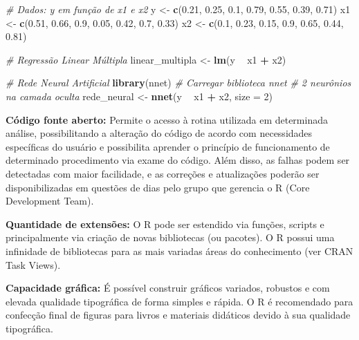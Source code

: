 \documentclass[
  11pt,
  a5paper,
  openany]{book}
\newenvironment{Shaded}{\begin{snugshade}}{\end{snugshade}}
\newcommand{\CommentTok}[1]{\textcolor[rgb]{0.56,0.35,0.01}{\textit{#1}}}
\newcommand{\DataTypeTok}[1]{\textcolor[rgb]{0.13,0.29,0.53}{#1}}
\newcommand{\DecValTok}[1]{\textcolor[rgb]{0.00,0.00,0.81}{#1}}
\newcommand{\FloatTok}[1]{\textcolor[rgb]{0.00,0.00,0.81}{#1}}
\newcommand{\KeywordTok}[1]{\textcolor[rgb]{0.13,0.29,0.53}{\textbf{#1}}}
\newcommand{\NormalTok}[1]{#1}
\newcommand{\OperatorTok}[1]{\textcolor[rgb]{0.81,0.36,0.00}{\textbf{#1}}}
\newcommand{\StringTok}[1]{\textcolor[rgb]{0.31,0.60,0.02}{#1}}
\begin{document}
\begin{Shaded}
\begin{Highlighting}[numbers=left,,]
\CommentTok{# Dados: y em função de x1 e x2}
\NormalTok{y <-}\StringTok{ }\KeywordTok{c}\NormalTok{(}\FloatTok{0.21}\NormalTok{, }\FloatTok{0.25}\NormalTok{, }\FloatTok{0.1}\NormalTok{, }\FloatTok{0.79}\NormalTok{, }\FloatTok{0.55}\NormalTok{, }\FloatTok{0.39}\NormalTok{, }\FloatTok{0.71}\NormalTok{)}
\NormalTok{x1 <-}\StringTok{ }\KeywordTok{c}\NormalTok{(}\FloatTok{0.51}\NormalTok{, }\FloatTok{0.66}\NormalTok{, }\FloatTok{0.9}\NormalTok{, }\FloatTok{0.05}\NormalTok{, }\FloatTok{0.42}\NormalTok{, }\FloatTok{0.7}\NormalTok{, }\FloatTok{0.33}\NormalTok{)}
\NormalTok{x2 <-}\StringTok{ }\KeywordTok{c}\NormalTok{(}\FloatTok{0.1}\NormalTok{, }\FloatTok{0.23}\NormalTok{, }\FloatTok{0.15}\NormalTok{, }\FloatTok{0.9}\NormalTok{, }\FloatTok{0.65}\NormalTok{, }\FloatTok{0.44}\NormalTok{, }\FloatTok{0.81}\NormalTok{)}

\CommentTok{# Regressão Linear Múltipla}
\NormalTok{linear_multipla <-}\StringTok{ }\KeywordTok{lm}\NormalTok{(y }\OperatorTok{~}\StringTok{ }\NormalTok{x1 }\OperatorTok{+}\StringTok{ }\NormalTok{x2)}

\CommentTok{# Rede Neural Artificial}
\KeywordTok{library}\NormalTok{(nnet) }\CommentTok{# Carregar biblioteca nnet}
\CommentTok{# 2 neurônios na camada oculta}
\NormalTok{rede_neural <-}\StringTok{ }\KeywordTok{nnet}\NormalTok{(y }\OperatorTok{~}\StringTok{ }\NormalTok{x1 }\OperatorTok{+}\StringTok{ }\NormalTok{x2, }\DataTypeTok{size =} \DecValTok{2}\NormalTok{)}
\end{Highlighting}
\end{Shaded}

\textbf{Código fonte aberto:} Permite o acesso à rotina utilizada em determinada análise, possibilitando a alteração do código de acordo com necessidades específicas do usuário e possibilita aprender o princípio de funcionamento de determinado procedimento via exame do código. Além disso, as falhas podem ser detectadas com maior facilidade, e as correções e atualizações poderão ser disponibilizadas em questões de dias pelo grupo que gerencia o R (Core Development Team).

\textbf{Quantidade de extensões:} O R pode ser estendido via funções, scripts e principalmente via criação de novas bibliotecas (ou pacotes). O R possui uma infinidade de bibliotecas para as mais variadas áreas do conhecimento (ver CRAN Task Views).

\textbf{Capacidade gráfica:} É possível construir gráficos variados, robustos e com elevada qualidade tipográfica de forma simples e rápida. O R é recomendado para confecção final de figuras para livros e materiais didáticos devido à sua qualidade tipográfica.
\end{document}

